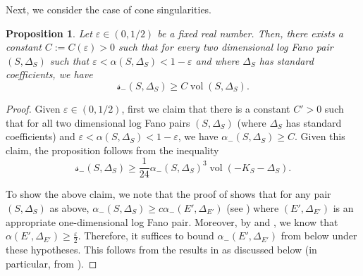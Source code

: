 \documentclass[11pt,reqno]{amsart}
\DeclareMathOperator{\vol}{vol}
\numberwithin{equation}{section}
\newtheorem{prop} {Proposition} [section]
\theoremstyle{definition}
\newcommand{\s}{\mathscr{s}}
\begin{document}
Next, we consider the case of cone singularities.


\begin{prop} \label{prop:effectiveboundforFanosurfaces}
    Let $\varepsilon \in (0, 1/2)$ be a fixed real number. Then, there exists a constant $C := C(\varepsilon) > 0$ such that for every two dimensional log Fano pair $(S, \Delta_S)$ such that $ \varepsilon < \alpha(S, \Delta_S) < 1 - \varepsilon $ and where $\Delta_S$ has standard coefficients, we have 
    \[  \s_{-} (S, \Delta_S) \geq C \vol (S, \Delta_S).\]
\end{prop}
\begin{proof}
    Given $\varepsilon \in (0, 1/2)$, first we claim that there is a constant $C'>0$ such that for all two dimensional log Fano pairs $(S, \Delta_S)$ (where $\Delta_S$ has standard coefficients) and $\varepsilon < \alpha(S, \Delta_S) < 1 - \varepsilon $, we have $\alpha_- (S, \Delta_S) \geq C$. Given this claim, the proposition follows from the inequality
    \[ \s_- (S, \Delta_S) \geq \frac{1}{24} \alpha_- (S, \Delta_S) ^3  \vol( - K_S - \Delta_S). \]

    To show the above claim, we note that the proof of  shows that for any pair $(S, \Delta_S)$ as above, $\alpha_{-} (S, \Delta_S) \geq c \alpha_{-} (E', \Delta_{E'})$ (see ) where $(E', \Delta_{E'}) $ is an appropriate one-dimensional log Fano pair. Moreover, by  and , we know that $\alpha(E', \Delta_{E'}) \geq \frac{\varepsilon}{2} $. Therefore, it suffices to bound $\alpha_- (E', \Delta_{E'}) $  from below under these hypotheses. This follows from the results in \cite{BCPTlimitFsigarxiv} as discussed below (in particular, from ).
\end{proof}
\end{document}
